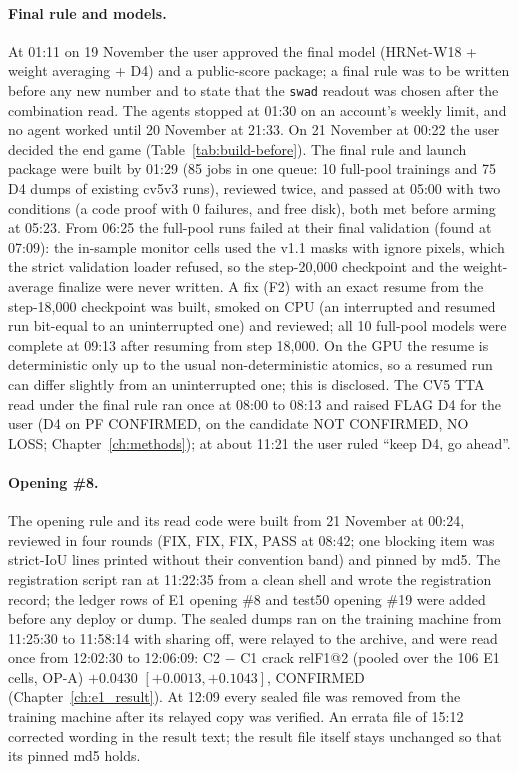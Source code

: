 \paragraph{Final rule and models.} At 01:11 on 19 November the user approved the final model (HRNet-W18 + weight averaging +
D4) and a public-score package; a final rule was to be written before any new number and to state that the \texttt{swad} readout
was chosen after the combination read. The agents stopped at 01:30 on an account's weekly limit, and no agent worked until 20 November at
21:33. On 21 November at 00:22 the user decided the end game (Table~\ref{tab:build-before}). The final rule and launch package were
built by 01:29 (85 jobs in one queue: 10 full-pool trainings and 75 D4 dumps of existing cv5v3 runs), reviewed twice, and passed at
05:00 with two conditions (a code proof with 0 failures, and free disk), both met before arming at 05:23. From 06:25 the full-pool
runs failed at their final validation (found at 07:09): the in-sample monitor cells used the v1.1 masks with ignore pixels, which the strict
validation loader refused, so the step-20,000 checkpoint and the weight-average finalize were never written. A fix (F2) with an
exact resume from the step-18,000 checkpoint was built, smoked on CPU (an interrupted and resumed run bit-equal to an uninterrupted
one) and reviewed; all 10 full-pool models were complete at 09:13 after resuming from step 18,000. On the GPU the resume is
deterministic only up to the usual non-deterministic atomics, so a resumed run can differ slightly from an uninterrupted one; this
is disclosed. The CV5 TTA read under the final
rule ran once at 08:00 to 08:13 and raised FLAG D4 for the user (D4 on PF CONFIRMED, on the candidate NOT CONFIRMED, NO LOSS;
Chapter~\ref{ch:methods}); at about 11:21 the user ruled ``keep D4, go ahead''.

\paragraph{Opening \#8.} The opening rule and its read code were built from 21 November at 00:24, reviewed in four rounds (FIX,
FIX, FIX, PASS at 08:42; one blocking item was strict-IoU lines printed without their convention band) and pinned by md5. The
registration script ran at 11:22:35 from a clean shell and wrote the registration record; the ledger rows of E1 opening \#8 and
test50 opening \#19 were added before any deploy or dump. The sealed dumps ran on the training machine from 11:25:30 to 11:58:14
with sharing off, were relayed to the archive, and were read once from 12:02:30 to 12:06:09: C2 $-$ C1 crack relF1@2 (pooled over the
106 E1 cells, OP-A) $+0.0430$ $[+0.0013, +0.1043]$, CONFIRMED (Chapter~\ref{ch:e1_result}). At 12:09 every sealed file was removed
from the training machine after its relayed copy was verified. An errata file of 15:12 corrected wording in the result text; the
result file itself stays unchanged so that its pinned md5 holds.

